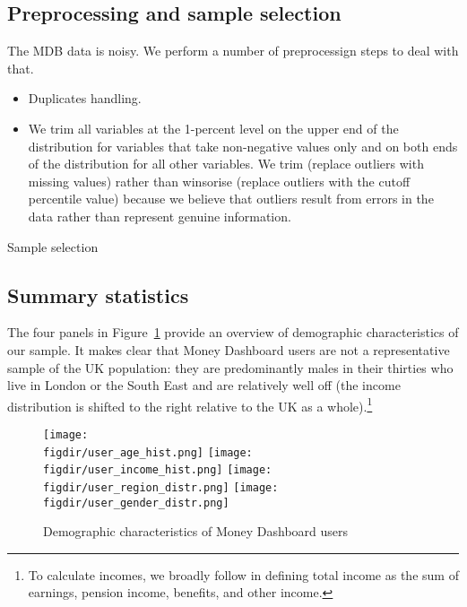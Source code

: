 \subsection{Preprocessing and sample selection}%
\label{sub:preprocessing_and_sample_selection}

The MDB data is noisy. We perform a number of preprocessign steps to deal with
that.

\begin{itemize}
    \item Duplicates handling.
    \item We trim all variables at the 1-percent level on the upper end of the
        distribution for variables that take non-negative values only and on
        both ends of the distribution for all other variables. We trim
        (replace outliers with missing values) rather than winsorise (replace
        outliers with the cutoff percentile value) because we believe that
        outliers result from errors in the data rather than represent genuine
        information.
\end{itemize}


\begin{table}[H]
\caption{Sample selection}\label{tab:selection}

\end{table}


\subsection{Summary statistics}%
\label{sub:summary_statistics}

The four panels in Figure~\ref{fig:sumstats} provide an overview of
demographic characteristics of our sample. It makes clear that Money Dashboard
users are not a representative sample of the UK population: they are
predominantly males in their thirties who live in London or the South East and
are relatively well off (the income distribution is shifted to the right
relative to the UK as a whole).\footnote{To calculate incomes, we broadly
    follow \citet{hacioglu2020distributional} in defining total income as the
sum of earnings, pension income, benefits, and other income.} 

\begin{figure}[H]
    \caption{Demographic characteristics of Money Dashboard users}
    \label{fig:sumstats}
    \begin{center}
        \texttt{[image: \\figdir/user\_age\_hist.png]}
        \texttt{[image: \\figdir/user\_income\_hist.png]}
        \texttt{[image: \\figdir/user\_region\_distr.png]}
        \texttt{[image: \\figdir/user\_gender\_distr.png]}
    \end{center}
\end{figure}

